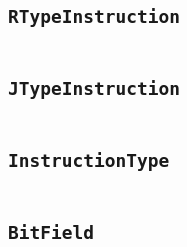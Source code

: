     \begin{landscape}
    \section{\texttt{RTypeInstruction}}\label{code:RTypeInstruction}
    \begin{multicols}{2} %
    \inputminted[mathescape,
        linenos,
        numbersep=5pt,
        frame=none,
        framesep=2mm,
        fontsize=\footnotesize]{java}{../src/main/java/se/filipallberg/dark/mips32decompiler/instruction/type/RTypeInstruction/RTypeInstruction.java}
    \end{multicols}
    \end{landscape}
    


    \begin{landscape}
    \section{\texttt{JTypeInstruction}}\label{code:JTypeInstruction}
    \begin{multicols}{2} %
    \inputminted[mathescape,
        linenos,
        numbersep=5pt,
        frame=none,
        framesep=2mm,
        fontsize=\footnotesize]{java}{../src/main/java/se/filipallberg/dark/mips32decompiler/instruction/type/JTypeInstruction/JTypeInstruction.java}
    \end{multicols}
    \end{landscape}
    


    \begin{landscape}
    \section{\texttt{InstructionType}}\label{code:InstructionType}
    \begin{multicols}{2} %
    \inputminted[mathescape,
        linenos,
        numbersep=5pt,
        frame=none,
        framesep=2mm,
        fontsize=\footnotesize]{java}{../src/main/java/se/filipallberg/dark/mips32decompiler/instruction/type/InstructionType.java}
    \end{multicols}
    \end{landscape}
    


    \begin{landscape}
    \section{\texttt{BitField}}\label{code:BitField}
    \begin{multicols}{2} %
    \inputminted[mathescape,
        linenos,
        numbersep=5pt,
        frame=none,
        framesep=2mm,
        fontsize=\footnotesize]{java}{../src/main/java/se/filipallberg/dark/mips32decompiler/instruction/type/BitField.java}
    \end{multicols}
    \end{landscape}
    


